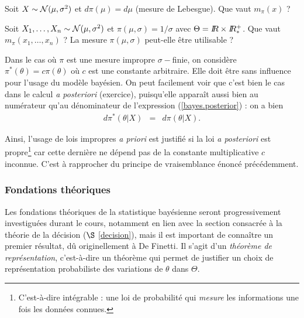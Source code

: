 \begin{exec}\label{exo4}
Soit $X\sim {\cal{N}}(\mu,\sigma^2)$ et $d\pi(\mu) = d \mu$ (mesure de Lebesgue). Que vaut $m_{\pi}(x)$ ? 
\end{exec}
\if{} 
\fi

\begin{exec}\label{exo5}
Soit $X_1,\ldots,X_n\sim {\cal{N}}(\mu,\sigma^2)$ et $\pi(\mu,\sigma) = 1/\sigma$ avec $\Theta=I\!\!R \times I\!\!R^+_*$.  Que vaut $m_{\pi}(x_1,\ldots,x_n)$ ? La mesure $\pi(\mu,\sigma)$ peut-elle être utilisable ?
\end{exec}
\if{} 
\fi

Dans le cas où $\pi$ est une mesure impropre $\sigma-$finie, on considère $\pi^*(\theta)=c\pi(\theta)$ où $c$ est une constante arbitraire. Elle doit être sans influence pour l'usage du modèle bayésien. On peut facilement voir que c'est bien le cas dans le calcul {\it a posteriori} (exercice), puisqu'elle apparaît aussi bien au numérateur qu'au dénominateur de l'expression (\ref{bayes.posterior}) : on a bien
\begin{eqnarray*}
d\pi^*(\theta|X) & = & d\pi(\theta|X).
\end{eqnarray*}

Ainsi, l'usage de lois impropres {\it a priori} est justifié si la loi {\it a posteriori} est propre\footnote{C'est-à-dire intégrable : une loi de probabilité qui \emph{mesure} les informations une fois les données connues.} car cette dernière ne dépend pas de la constante multiplicative $c$ inconnue. C'est à rapprocher du principe de vraisemblance énoncé précédemment. 


\subsubsection{Fondations théoriques}

Les fondations théoriques de la statistique bayésienne seront progressivement investiguées durant le cours, notamment en lien avec la section consacrée à la théorie de la décision ($\S$ \ref{decision}), mais il est important de connaître un premier résultat, dû originellement à De Finetti. Il s'agit d'un \emph{théorème de représentation}, c'est-à-dire un théorème qui permet de justifier un choix de représentation probabiliste des variations de $\theta$ dans $\Theta$. \\

